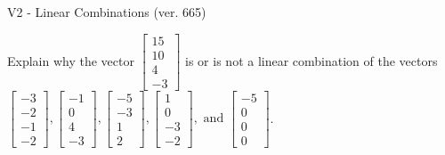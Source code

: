 \begin{exercise}
  \begin{exerciseTitle}V2 - Linear Combinations (ver. 665)\end{exerciseTitle}
  \begin{exerciseStatement}
    Explain why the vector \(\left[\begin{array}{c}
15 \\
10 \\
4 \\
-3
\end{array}\right]\)  is or is not a linear 
	combination of the vectors \(\left[\begin{array}{c}
-3 \\
-2 \\
-1 \\
-2
\end{array}\right] , \left[\begin{array}{c}
-1 \\
0 \\
4 \\
-3
\end{array}\right] , \left[\begin{array}{c}
-5 \\
-3 \\
1 \\
2
\end{array}\right] , \left[\begin{array}{c}
1 \\
0 \\
-3 \\
-2
\end{array}\right] , \text{ and } \left[\begin{array}{c}
-5 \\
0 \\
0 \\
0
\end{array}\right]\).
	



\end{exerciseStatement}
\end{exercise}
